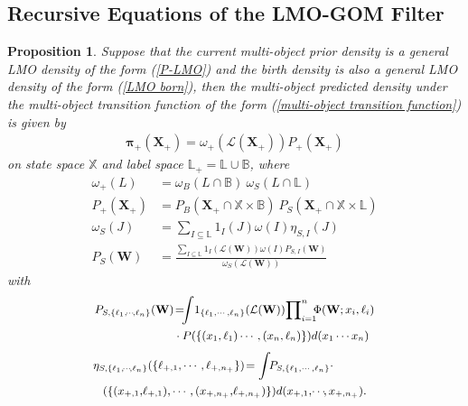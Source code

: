 \documentclass[journal]{IEEEtran}
\newcommand{\bW}{{\mathbf W}}
\newcommand{\bX}{{\mathbf X}}
\newcommand{\bpi}{{\boldsymbol\pi}}
\newtheorem{Pro}{Proposition}
\begin{document}
{\subsection{Recursive Equations of the LMO-GOM Filter}
\begin{Pro}\label{pro:1}
Suppose that  the current multi-object prior density is a general LMO density of the form  (\ref{P-LMO})
and the birth density is also a general LMO density of the form (\ref{LMO born}),
then the multi-object predicted density under the multi-object transition function of the form (\ref{multi-object transition function}) is given by
\begin{align}\label{multi-object predicted density}
\bpi_{+}(\bX_+)=\omega_{+}(\mathcal{L}(\bX_+))P_{+}(\bX_+)
\end{align}
on state space $\mathbb{X}$ and label space $\mathbb{L}_+=\mathbb{L}\cup\mathbb{B}$,
where
\begin{align}
\label{w-add}\omega_{+}(L)&=\omega_{B}(L\cap\mathbb{B})\ \omega_S(L\cap\mathbb{L})\\
\label{p-add}P_{+}(\bX_+)&=P_B(\bX_+\cap\mathbb{X}\times\mathbb{B})\  P_S(\bX_+\cap\mathbb{X}\times\mathbb{L})\\
\label{ws}\omega_S(J)&={\sum}_{I\subseteq\mathbb{L}}1_{I}(J)\omega(I)\eta_{S,I}(J)\\
\label{Ps}P_S(\bW)&=\frac{\sum_{I\subseteq\mathbb{L}}1_{I}(\mathcal{L}(\bW))\omega(I)P_{S,I}(\bW)}{\omega_S(\mathcal{L}(\bW))}
\end{align}
with
\begin{equation}
{\small
\begin{split}
\label{Ps-I} P_{S,\{\ell_{1},\!\cdots\!,\ell_{n}\}}(\bW)&\!=\!
\!\!\int \!1_{\{\ell_{1},\cdots,\ell_{n}\}}(\mathcal{L}(\bW)) {\prod}^{n}_{i=1}\!\!\Phi(\bW; x_{i},\ell_i)\\
& \cdot P(\{(x_1,\ell_1)\cdots,(x_n,\ell_n)\})d (x_{1}\cdots  x_{n})
\end{split}}
\end{equation} 
\begin{equation}
{\small
\begin{split}
\label{where_0} &\!\!\!\!\!\eta_{S,\{\ell_1,\!\cdots\!,\ell_n\}}(\{\ell_{+,1},\cdots,\ell_{+,{n_+}}\})\!=
 \int \! \!P_{S,\{\ell_{1},\cdots,\ell_{n}\}}\cdot\\&(\{(x_{+,1},\!\ell_{+,1}),\cdots,(x_{+,n_+},\!\ell_{+,n_+})\})d (x_{+,1},\!\cdots\!\!,x_{+,n_{+}}).
\end{split}}
\end{equation}
\end{Pro}

}
\end{document}

